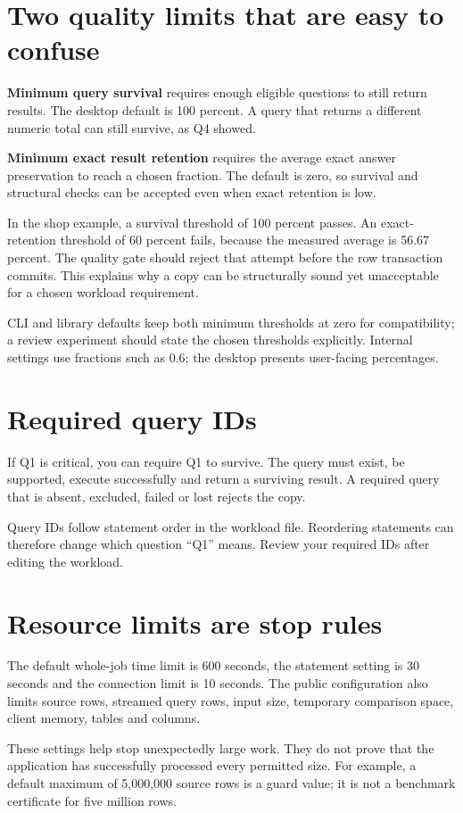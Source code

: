 \documentclass[12pt,a4paper,oneside]{report}
\begin{document}
\section{Two quality limits that are easy to confuse}
\textbf{Minimum query survival} requires enough eligible questions to still return results. The desktop default is 100 percent. A query that returns a different numeric total can still survive, as Q4 showed.

\textbf{Minimum exact result retention} requires the average exact answer preservation to reach a chosen fraction. The default is zero, so survival and structural checks can be accepted even when exact retention is low.

In the shop example, a survival threshold of 100 percent passes. An exact-retention threshold of 60 percent fails, because the measured average is 56.67 percent. The quality gate should reject that attempt before the row transaction commits. This explains why a copy can be structurally sound yet unacceptable for a chosen workload requirement.

CLI and library defaults keep both minimum thresholds at zero for compatibility; a review experiment should state the chosen thresholds explicitly. Internal settings use fractions such as 0.6; the desktop presents user-facing percentages.

\section{Required query IDs}
If Q1 is critical, you can require Q1 to survive. The query must exist, be supported, execute successfully and return a surviving result. A required query that is absent, excluded, failed or lost rejects the copy.

Query IDs follow statement order in the workload file. Reordering statements can therefore change which question ``Q1'' means. Review your required IDs after editing the workload.

\section{Resource limits are stop rules}
The default whole-job time limit is 600 seconds, the statement setting is 30 seconds and the connection limit is 10 seconds. The public configuration also limits source rows, streamed query rows, input size, temporary comparison space, client memory, tables and columns.

These settings help stop unexpectedly large work. They do not prove that the application has successfully processed every permitted size. For example, a default maximum of 5,000,000 source rows is a guard value; it is not a benchmark certificate for five million rows.
\end{document}
